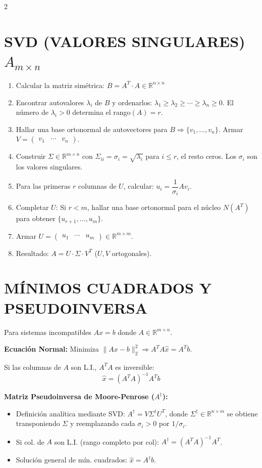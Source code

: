 \documentclass[10pt]{extarticle}
\newenvironment{term}
  {\begin{minipage}{\linewidth}}
  {\end{minipage}\par}
\begin{document}
\begin{multicols}{2}
\begin{term}
\section*{SVD (VALORES SINGULARES) $A_{m\times n}$}
\begin{enumerate}
\item Calcular la matriz simétrica: $B = A^T\cdot A \in \mathbb{R}^{n\times n}$
\item Encontrar autovalores $\lambda_i$ de $B$ y ordenarlos: $\lambda_1 \ge \lambda_2 \ge \cdots \ge \lambda_n \ge 0$. El número de $\lambda_i > 0$ determina el rango$(A) = r$.
\item Hallar una base ortonormal de autovectores para $B \Rightarrow \{v_1,\ldots,v_n\}$. Armar $V = \begin{pmatrix}v_1 & \cdots & v_n\end{pmatrix}$.
\item Construir $\Sigma \in \mathbb{R}^{m\times n}$ con $\Sigma_{ii} = \sigma_i = \sqrt{\lambda_i}$ para $i \le r$, el resto ceros. Los $\sigma_i$ son los valores singulares.
\item Para las primeras $r$ columnas de $U$, calcular: $u_i = \dfrac{1}{\sigma_i}Av_i$.
\item Completar $U$: Si $r < m$, hallar una base ortonormal para el núcleo $N(A^T)$ para obtener $\{u_{r+1},\ldots,u_m\}$.
\item Armar $U = \begin{pmatrix}u_1 & \cdots & u_m\end{pmatrix} \in \mathbb{R}^{m\times m}$.
\item Resultado: $A = U\cdot\Sigma\cdot V^T$ ($U,V$ ortogonales).
\end{enumerate}
\end{term}

\begin{term}
\section*{MÍNIMOS CUADRADOS Y PSEUDOINVERSA}
Para sistemas incompatibles $Ax=b$ donde $A \in \mathbb{R}^{m\times n}$.

\textbf{Ecuación Normal:} Minimiza $\|Ax-b\|_2^2 \Rightarrow A^TA\hat{x} = A^Tb$.

Si las columnas de $A$ son L.I., $A^TA$ es inversible:
$$\hat{x} = (A^TA)^{-1}A^Tb$$

\textbf{Matriz Pseudoinversa de Moore-Penrose ($A^\dagger$):}
\begin{itemize}[leftmargin=1.2em]
\item Definición analítica mediante SVD: $A^\dagger = V\Sigma^\dagger U^T$, donde $\Sigma^\dagger \in \mathbb{R}^{n\times m}$ se obtiene transponiendo $\Sigma$ y reemplazando cada $\sigma_i > 0$ por $1/\sigma_i$.
\item Si col. de $A$ son L.I. (rango completo por col): $A^\dagger = (A^TA)^{-1}A^T$.
\item Solución general de mín. cuadrados: $\hat{x} = A^\dagger b$.
\end{itemize}
\end{term}




\end{multicols}
\end{document}
